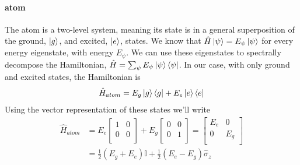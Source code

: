 \paragraph*{atom}
The atom is a two-level system, meaning its state is in a general superposition of the ground, $\ket{g}$, and excited, $\ket{e}$, states. We know that $\hat{H}\ket{\psi} = E_\psi \ket{\psi}$ for every energy eigenstate, with energy $E_\psi$. We can use these eigenstates to spectrally decompose the Hamiltonian, $\hat{H} = \sum_\psi E_\psi \ket{\psi}\bra{\psi}$. In our case, with only ground and excited states, the Hamiltonian is
\begin{equation}
    \hat{H}_{atom} = E_g\ket{g}\bra{g} + E_e\ket{e}\bra{e}
\end{equation}
Using the vector representation of these states we'll write
\begin{align*} 
    \hat{H}_{atom} &= 
    E_e \begin{bmatrix}
    1 & 0     \\
    0   & 0   \\
    \end{bmatrix}
    + E_g \begin{bmatrix}
    0 & 0     \\
    0   & 1   \\
    \end{bmatrix} = 
    \begin{bmatrix}
    E_e & 0     \\
    0   & E_g   \\
    \end{bmatrix} \\
    &= \frac{1}{2} (E_g + E_e)\mathbb{I} + \frac{1}{2} (E_e - E_g)\hat{\sigma}_z
\end{align*}
